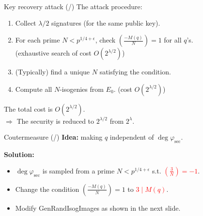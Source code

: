 \documentclass[12pt]{beamer}
\newcommand{\End}{\mathrm{End}}
\newcommand{\red}[1]{\textcolor{red}{#1}}
\begin{document}
\begin{frame}{Key recovery attack (/\attacktotal{})}
    The attack procedure:
    \begin{enumerate}
        \item Collect $\lambda/2$ signatures (for the same public key).
        \item For each prime $N < p^{1/4+\epsilon}$, 
            check $\left(\frac{-M(q)}{N}\right) = 1$ for all $q$'s.\\
            (exhaustive search of cost $O(2^{\lambda/2})$)
        \item (Typically) find a unique $N$ satisfying the condition.
        \item Compute all $N$-isogenies from $E_0$. (cost $O(2^{\lambda/2})$)
    \end{enumerate}

    \vspace{10pt}
    The total cost is $O(2^{\lambda/2})$.\\[5pt]
    $\Rightarrow$ The security is reduced to $2^{\lambda/2}$ from $2^\lambda$.
\end{frame}

\newcommand*{\countermeasuretotal}{\total{countermeasurecnt}}
\begin{frame}{Coutermeasure (/\countermeasuretotal{})}
    \textbf{Idea:}
    making $q$ independent of $\deg\varphi_\mathrm{sec}$.

    \vspace{10pt}
    \textbf{Solution:}
    \begin{itemize}
        \item $\deg\varphi_\mathrm{sec}$ is sampled from
            a prime $N < p^{1/4+\epsilon}$ s.t. \red{$\left(\frac{3}{N}\right) = -1$}.
        \item Change the condition $\left(\frac{-M(q)}{N}\right) = 1$ to
            \red{$3 \mid M(q)$}.
        \item Modify \textsf{GenRandIsogImages} as shown in the next slide.
            \iffalse
            $\left(\frac{-M(q)}{N}\right) = 1 \Rightarrow$ compute $\alpha \in \End(E_\mathrm{pub})$ s.t. $\deg\alpha = M(q)$.\\[5pt]
            $\left(\frac{-M(q)}{N}\right) = -1$ (so $\left(\frac{-M(q)/3}{N}\right) = 1$)\\
                    $\Rightarrow$ compute $\alpha \in \End(E_\mathrm{pub})$ s.t. $\deg\alpha = M(q)/3$\\
                    \hphantom{$\Rightarrow$} and compute a random $3$-isogeny $\varphi_3: E_\mathrm{pub} \to E_3$.\\
                    \hphantom{$\Rightarrow$} Then, $\deg(\varphi_3 \circ \alpha) = M(q)$
            \fi
    \end{itemize}
\end{frame}
\end{document}
